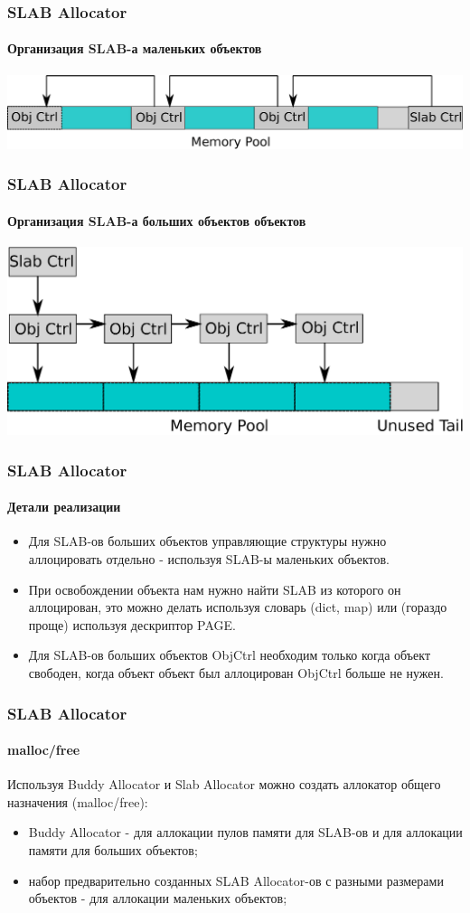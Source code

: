 \begin{frame}
\frametitle{SLAB Allocator}
\framesubtitle{Организация SLAB-а маленьких объектов}

\includegraphics[width=.9\linewidth]{slab-small}

\end{frame}

\begin{frame}
\frametitle{SLAB Allocator}
\framesubtitle{Организация SLAB-а больших объектов объектов}

\includegraphics[width=.9\linewidth]{slab-large}

\end{frame}

\begin{frame}
\frametitle{SLAB Allocator}
\framesubtitle{Детали реализации}

\begin{itemize}
  \item Для SLAB-ов больших объектов управляющие структуры нужно аллоцировать отдельно - используя SLAB-ы маленьких объектов.
  \item При освобождении объекта нам нужно найти SLAB из которого он аллоцирован, это можно делать используя словарь (dict, map) или (гораздо проще) используя дескриптор PAGE.
  \item Для SLAB-ов больших объектов ObjCtrl необходим только когда объект свободен, когда объект объект был аллоцирован ObjCtrl больше не нужен.
\end{itemize}
\end{frame}

\begin{frame}
\frametitle{SLAB Allocator}
\framesubtitle{malloc/free}

Используя Buddy Allocator и Slab Allocator можно создать аллокатор общего назначения (malloc/free):
\begin{itemize}
  \item Buddy Allocator - для аллокации пулов памяти для SLAB-ов и для аллокации памяти для больших объектов;
  \item набор предварительно созданных SLAB Allocator-ов с разными размерами объектов - для аллокации маленьких объектов;
\end{itemize}
\end{frame}

